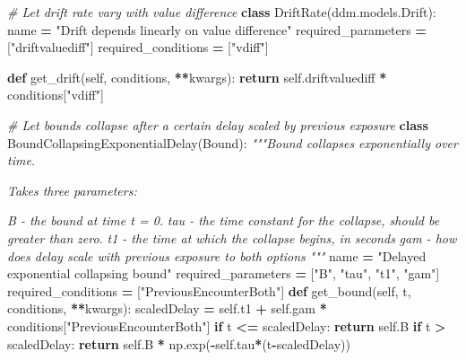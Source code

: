 \documentclass[
]{book}
\newenvironment{Shaded}{\begin{snugshade}}{\end{snugshade}}
\newcommand{\CommentTok}[1]{\textcolor[rgb]{0.56,0.35,0.01}{\textit{#1}}}
\newcommand{\ControlFlowTok}[1]{\textcolor[rgb]{0.13,0.29,0.53}{\textbf{#1}}}
\newcommand{\KeywordTok}[1]{\textcolor[rgb]{0.13,0.29,0.53}{\textbf{#1}}}
\newcommand{\NormalTok}[1]{#1}
\newcommand{\OperatorTok}[1]{\textcolor[rgb]{0.81,0.36,0.00}{\textbf{#1}}}
\newcommand{\StringTok}[1]{\textcolor[rgb]{0.31,0.60,0.02}{#1}}
\newcommand{\VariableTok}[1]{\textcolor[rgb]{0.00,0.00,0.00}{#1}}
\begin{document}
\begin{Shaded}
\begin{Highlighting}[]
\CommentTok{\# Let drift rate vary with value difference}
\KeywordTok{class}\NormalTok{ DriftRate(ddm.models.Drift):}
\NormalTok{  name }\OperatorTok{=} \StringTok{"Drift depends linearly on value difference"}
\NormalTok{  required\_parameters }\OperatorTok{=}\NormalTok{ [}\StringTok{"driftvaluediff"}\NormalTok{]}
\NormalTok{  required\_conditions }\OperatorTok{=}\NormalTok{ [}\StringTok{"vdiff"}\NormalTok{]}
  
  \KeywordTok{def}\NormalTok{ get\_drift(}\VariableTok{self}\NormalTok{, conditions, }\OperatorTok{**}\NormalTok{kwargs):}
    \ControlFlowTok{return} \VariableTok{self}\NormalTok{.driftvaluediff }\OperatorTok{*}\NormalTok{ conditions[}\StringTok{"vdiff"}\NormalTok{]}
    
\CommentTok{\# Let bounds collapse after a certain delay scaled by previous exposure}
\KeywordTok{class}\NormalTok{ BoundCollapsingExponentialDelay(Bound):}
    \CommentTok{"""Bound collapses exponentially over time.}

\CommentTok{    Takes three parameters: }

\CommentTok{    \textasciigrave{}B\textasciigrave{} {-} the bound at time t = 0.}
\CommentTok{    \textasciigrave{}tau\textasciigrave{} {-} the time constant for the collapse, should be greater than}
\CommentTok{    zero.}
\CommentTok{    \textasciigrave{}t1\textasciigrave{} {-} the time at which the collapse begins, in seconds}
\CommentTok{    \textasciigrave{}gam\textasciigrave{} {-} how does delay scale with previous exposure to both options}
\CommentTok{    """}
\NormalTok{    name }\OperatorTok{=} \StringTok{"Delayed exponential collapsing bound"}
\NormalTok{    required\_parameters }\OperatorTok{=}\NormalTok{ [}\StringTok{"B"}\NormalTok{, }\StringTok{"tau"}\NormalTok{, }\StringTok{"t1"}\NormalTok{, }\StringTok{"gam"}\NormalTok{]}
\NormalTok{    required\_conditions }\OperatorTok{=}\NormalTok{ [}\StringTok{"PreviousEncounterBoth"}\NormalTok{]}
    \KeywordTok{def}\NormalTok{ get\_bound(}\VariableTok{self}\NormalTok{, t, conditions, }\OperatorTok{**}\NormalTok{kwargs):}
\NormalTok{        scaledDelay }\OperatorTok{=} \VariableTok{self}\NormalTok{.t1 }\OperatorTok{+} \VariableTok{self}\NormalTok{.gam }\OperatorTok{*}\NormalTok{ conditions[}\StringTok{"PreviousEncounterBoth"}\NormalTok{]}
        \ControlFlowTok{if}\NormalTok{ t }\OperatorTok{\textless{}=}\NormalTok{ scaledDelay:}
            \ControlFlowTok{return} \VariableTok{self}\NormalTok{.B}
        \ControlFlowTok{if}\NormalTok{ t }\OperatorTok{\textgreater{}}\NormalTok{ scaledDelay:}
            \ControlFlowTok{return} \VariableTok{self}\NormalTok{.B }\OperatorTok{*}\NormalTok{ np.exp(}\OperatorTok{{-}}\VariableTok{self}\NormalTok{.tau}\OperatorTok{*}\NormalTok{(t}\OperatorTok{{-}}\NormalTok{scaledDelay))}


\end{Highlighting}
\end{Shaded}
\end{document}
